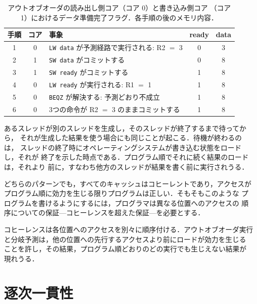 \documentclass[../main.tex]{subfiles}
\begin{document}
\begin{table}[htbp]
  \centering\small
  \caption{アウトオブオーダの読み出し側コア（コア 0）と書き込み側コア
    （コア 1）におけるデータ準備完了フラグ．各手順の後のメモリ内容．}
  \label{tab:l21-ready}
  \begin{tabular}{@{}cclcc@{}}
    \toprule
    手順 & コア & 事象 & ready & data \\
    \midrule
    1 & 0 & \texttt{LW data} が予測経路で実行される: R2 $=$ 3 & 0 & 3 \\
    2 & 1 & \texttt{SW data} がコミットする                   & 0 & 8 \\
    3 & 1 & \texttt{SW ready} がコミットする                  & 1 & 8 \\
    4 & 0 & \texttt{LW ready} が実行される: R1 $=$ 1          & 1 & 8 \\
    5 & 0 & \texttt{BEQZ} が解決する: 予測どおり不成立        & 1 & 8 \\
    6 & 0 & 3つの命令が R2 $=$ 3 のままコミットする           & 1 & 8 \\
    \bottomrule
  \end{tabular}
\end{table}

あるスレッドが別のスレッドを生成し，そのスレッドが終了するまで待ってから，
それが生成した結果を使う場合にも同じことが起こる．待機が終わるのは，
スレッドの終了時にオペレーティングシステムが書き込む状態をロードし，それが
終了を示した時点である．プログラム順でそれに続く結果のロードは，それより
前に，すなわち他方のスレッドが結果を書く前に実行されうる．

どちらのパターンでも，すべてのキャッシュはコヒーレントであり，アクセスが
プログラム順に効力を生じる限りプログラムは正しい．そもそもこのような
プログラムを書けるようにするには，プログラマは異なる位置へのアクセスの
順序についての保証---コヒーレンスを超えた保証---を必要とする．

\begin{keypoint}
  コヒーレンスは各位置へのアクセスを別々に順序付ける．アウトオブオーダ実行
  と分岐予測は，他の位置への先行するアクセスより前にロードが効力を生じる
  ことを許し，その結果，プログラム順どおりのどの実行でも生じえない結果が
  現れうる．
\end{keypoint}

\section{逐次一貫性}
\label{sec:l21-sc}
\end{document}
